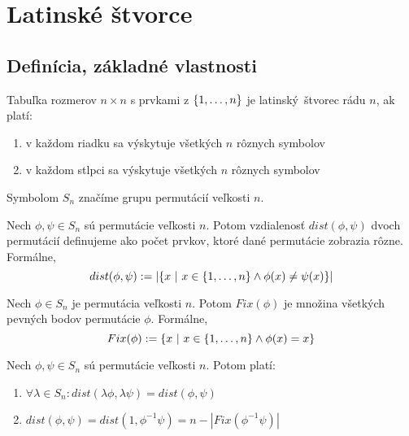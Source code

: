\chapter{Latinské štvorce}

\section{Definícia, základné vlastnosti}

\begin{definition}
Tabuľka rozmerov $n\times n$ s prvkami z $\left\{1, \ldots, n\right\}$ je latinský~štvorec rádu $n$, ak platí:
\begin{enumerate}
    \item v každom riadku sa výskytuje všetkých $n$ rôznych symbolov
    \item v každom stlpci sa výskytuje všetkých $n$ rôznych symbolov
\end{enumerate}
\end{definition}

Symbolom $S_n$ značíme grupu permutácií veľkosti $n$.

\begin{definition}
Nech $\phi, \psi \in S_n$ sú permutácie veľkosti $n$. Potom vzdialenosť $dist(\phi, \psi)$ dvoch permutácií definujeme ako počet
prvkov, ktoré dané permutácie zobrazia rôzne. Formálne, $$dist(\phi, \psi) := \left| \left\{x ~|~ x \in \left\{1, \ldots, n\right\} \wedge \phi(x) \neq \psi(x) \right\} \right| $$
\end{definition}

\begin{definition}
Nech $\phi \in S_n$ je permutácia veľkosti $n$. Potom $Fix(\phi)$ je množina všetkých pevných bodov permutácie $\phi$. Formálne,
$$Fix(\phi) := \left\{x ~|~ x \in \left\{1, \ldots, n\right\} \wedge \phi(x) = x\right\}$$ 
\end{definition}

\begin{theorem}

Nech $\phi, \psi \in S_n$ sú permutácie veľkosti $n$. Potom platí:

\begin{enumerate}
    \item $\forall \lambda \in S_n: dist(\lambda \phi, \lambda \psi) = dist(\phi, \psi)$ 
    \item $dist(\phi, \psi) = dist(1, \phi^{-1} \psi) = n - |Fix(\phi^{-1} \psi)|$
\end{enumerate}
\end{theorem}

